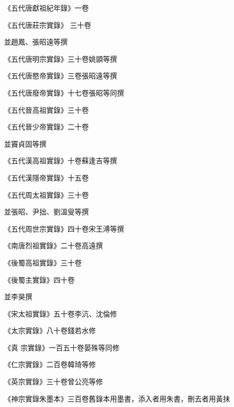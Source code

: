 \begin{pinyinscope}
 《五代唐獻祖紀年錄》一卷



 《五代唐莊宗實錄》
 三十卷



 並趙鳳、張昭遠等撰



 《五代唐明宗實錄》三十卷姚顗等撰



 《五代唐愍帝實錄》三卷張昭遠等撰



 《五代唐廢帝實錄》十七卷張昭等同撰



 《五代晉高祖實錄》三十卷



 《五代晉少帝實錄》二十卷



 並竇貞固等撰



 《五代漢高祖實錄》十卷蘇逢吉等撰



 《五代漢隱帝實錄》十五卷



 《五代周太祖實錄》三十卷



 並張昭、尹拙、劉溫叟等撰



 《五代周世宗實錄》四十卷宋王溥等撰



 《南唐烈祖實錄》二十卷高遠撰



 《後蜀高祖實錄》三十卷



 《後蜀主實錄》四十卷



 並李昊撰



 《宋太祖實錄》五十卷李沆、沈倫修



 《太宗實錄》八十卷錢若水修



 《真
 宗實錄》一百五十卷晏殊等同修



 《仁宗實錄》二百卷韓琦等修



 《英宗實錄》三十卷曾公亮等修



 《神宗實錄朱墨本》三百卷舊錄本用墨書，添入者用朱書，刪去者用黃抹




\end{pinyinscope}
